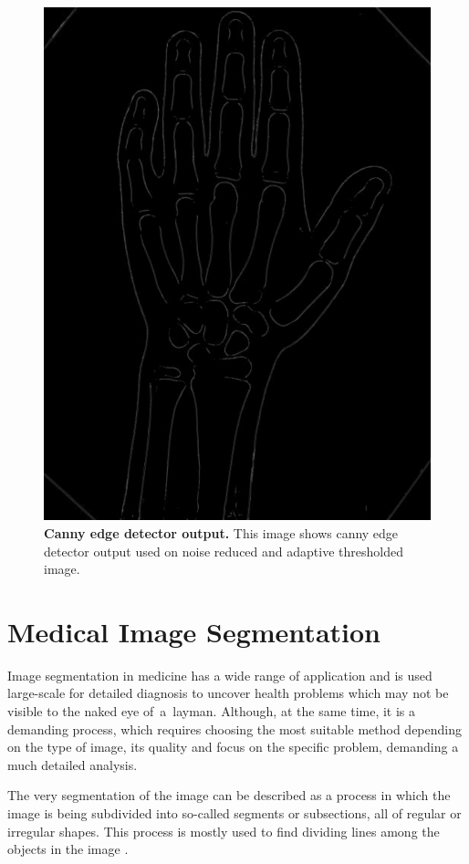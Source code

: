 \begin{figure}[!ht]
    \centering
    \includegraphics[width=.5\textwidth]{obrazky-figures/canny.pdf}
    \caption{\textbf{Canny edge detector output.} This image shows canny edge detector output used on noise reduced and adaptive thresholded image.}
    \label{canny-output}
\end{figure}

\section{Medical Image Segmentation}
Image segmentation in medicine has a wide range of application and is used large-scale for detailed diagnosis to uncover health problems which may not be visible to the naked eye of~a~layman. Although, at the same time, it is a demanding process, which requires choosing the most suitable method depending on the type of image, its quality and focus on the specific problem, demanding a much detailed analysis. 

The very segmentation of the image can be described as a process in which the image is being subdivided into so-called segments or subsections, all of regular or irregular shapes. This process is mostly used to find dividing lines among the objects in the image \cite{image-segmentation}.


